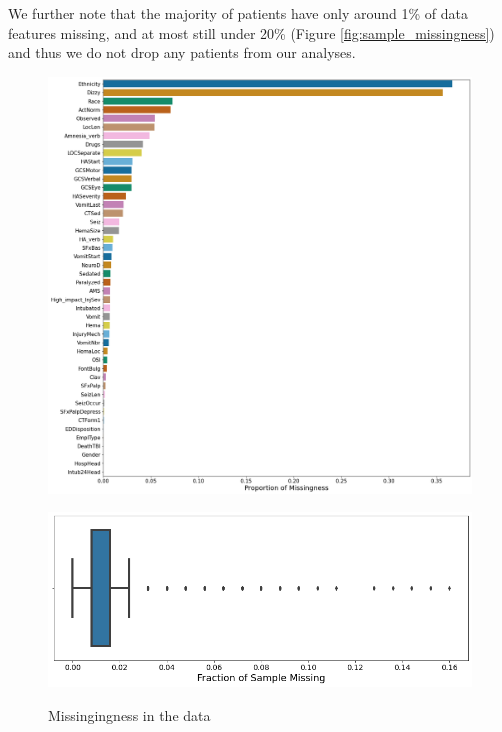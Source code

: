 \documentclass[11pt, letterpaper]{amsart}
\begin{document}
We further note that the majority of patients have only around 1\% of data features missing, and at most still under 20\% (Figure \ref{fig:sample_missingness}) and thus we do not drop any patients from our analyses.
\begin{figure}
	\begin{minipage}[b]{0.5\linewidth}
		\centering
		\includegraphics[width=\textwidth]{covariate_missingness.png}
		\label{fig:cov_missing}
	\end{minipage}
	\begin{minipage}[b]{0.5\linewidth}
		\centering
		\includegraphics[width=\textwidth]{sample_missingness.png}
		\label{fig:sample_missingness}
	\end{minipage}
	\caption{Missingingness in the data}\label{fig:missing_agg}
\end{figure}
\end{document}
